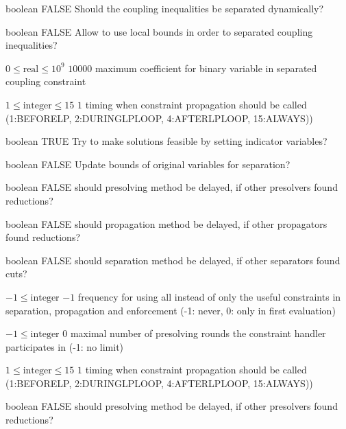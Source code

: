%
{boolean}%
{FALSE}%
{Should the coupling inequalities be separated dynamically?}%
{}

%
{boolean}%
{FALSE}%
{Allow to use local bounds in order to separated coupling inequalities?}%
{}

%
{$0\leq\textrm{real}\leq10^{  9}$}%
{$10000$}%
{maximum coefficient for binary variable in separated coupling constraint}%
{}

%
{$1\leq\textrm{integer}\leq15$}%
{$1$}%
{timing when constraint propagation should be called (1:BEFORELP, 2:DURINGLPLOOP, 4:AFTERLPLOOP, 15:ALWAYS))}%
{}

%
{boolean}%
{TRUE}%
{Try to make solutions feasible by setting indicator variables?}%
{}

%
{boolean}%
{FALSE}%
{Update bounds of original variables for separation?}%
{}

%
{boolean}%
{FALSE}%
{should presolving method be delayed, if other presolvers found reductions?}%
{}

%
{boolean}%
{FALSE}%
{should propagation method be delayed, if other propagators found reductions?}%
{}

%
{boolean}%
{FALSE}%
{should separation method be delayed, if other separators found cuts?}%
{}

%
{$-1\leq\textrm{integer}$}%
{$-1$}%
{frequency for using all instead of only the useful constraints in separation, propagation and enforcement (-1: never, 0: only in first evaluation)}%
{}

%
{$-1\leq\textrm{integer}$}%
{$0$}%
{maximal number of presolving rounds the constraint handler participates in (-1: no limit)}%
{}

%
{$1\leq\textrm{integer}\leq15$}%
{$1$}%
{timing when constraint propagation should be called (1:BEFORELP, 2:DURINGLPLOOP, 4:AFTERLPLOOP, 15:ALWAYS))}%
{}

%
{boolean}%
{FALSE}%
{should presolving method be delayed, if other presolvers found reductions?}%
{}

